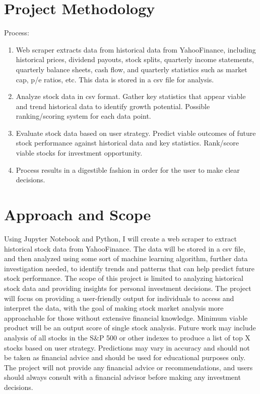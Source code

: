 \documentclass[runningheads]{llncs}
\begin{document}
\section{Project Methodology}

Process:
\begin{enumerate}

\item Web scraper extracts data from historical data from YahooFinance, including historical prices, dividend payouts, stock splits, quarterly income statements, quarterly balance sheets, cash flow, and quarterly statistics such as market cap, p/e ratios, etc. This data is stored in a csv file for analysis.
\item Analyze stock data in csv format. Gather key statistics that appear viable and trend historical data to identify growth potential. Possible ranking/scoring system for each data point.
\item Evaluate stock data based on user strategy. Predict viable outcomes of future stock performance against historical data and key statistics. Rank/score viable stocks for investment opportunity.
\item Process results in a digestible fashion in order for the user to make clear decisions.

\end{enumerate}

\section{Approach and Scope}

Using Jupyter Notebook and Python, I will create a web scraper to extract historical stock data from YahooFinance. The data will be stored in a csv file, and then analyzed using some sort of machine learning algorithm, further data investigation needed, to identify trends and patterns that can help predict future stock performance. The scope of this project is limited to analyzing historical stock data and providing insights for personal investment decisions. The project will focus on providing a user-friendly output for individuals to access and interpret the data, with the goal of making stock market analysis more approachable for those without extensive financial knowledge. Minimum viable product will be an output score of single stock analysis. Future work may include analysis of all stocks in the S\&P 500 or other indexes to produce a list of top X stocks based on user strategy. Predictions may vary in accuracy and should not be taken as financial advice and should be used for educational purposes only. The project will not provide any financial advice or recommendations, and users should always consult with a financial advisor before making any investment decisions.
\end{document}
